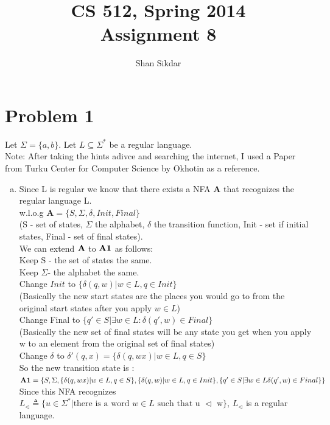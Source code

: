 \documentclass[11pt,leqno,fleqn]{article}
\title{CS 512, Spring 2014
       \\[1ex]
       \textbf{Assignment 8}}
\author{Shan Sikdar}
\date{} %
\begin{document}
\maketitle

\section{Problem 1}
Let $\Sigma = \{ a,b \}$. Let $L \subseteq \Sigma^*$ be a regular language.\\
Note: After taking the hints adivce and searching the internet, I used a Paper from Turku Center for Computer Science by Okhotin as a reference.
\begin{enumerate}[(a)]
\item
Since L is regular we know that there exists a NFA $\mathbf{A}$ that recognizes the regular language L.\\
w.l.o.g $\mathbf{A} = \{ S , \Sigma, \delta, Init, Final \}$\\
 (S - set of states, $\Sigma$ the alphabet, $\delta$ the transition function, Init - set if initial states, Final - set of final states).\\
 
We can extend $\bold{A}$ to $\bold{A1}$ as follows:\\
Keep S - the set of states the same.\\
Keep $\Sigma$- the alphabet the same.\\
Change $Init$ to $\{ \delta(q,w) | w \in L, q\in Init \}$\\
(Basically the new start states are the places you would go to from the original start states after you apply $w \in L$)\\
Change Final to $\{ q' \in S | \exists w \in L :\delta(q',w) \in Final \}$\\
(Basically the new set of final states will be any state you get when you apply w to an element from the original set of final states)\\
Change $\delta$ to $\delta'(q,x) = \{\delta(q,wx)|w \in L, q \in S\}$\\
So the new transition state is :\\
$\bold{A1} = \{ S, \Sigma, \{\delta(q,wx)|w \in L, q \in S\},\{ \delta(q,w) | w \in L, q\in Init \} , \{ q' \in S | \exists w \in L \delta(q',w) \in Final \} \}$\\
Since this NFA recognizes $L_{\triangleleft} \triangleq \{ u \in \Sigma^* | \text{there is a word $w \in L$ such that u $\triangleleft$ w}\}$, $L_{\triangleleft}$ is a regular language.


\end{enumerate}
\end{document}
